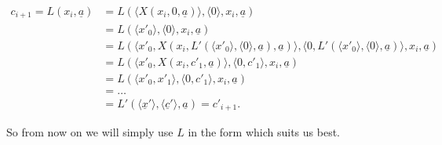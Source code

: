 \documentclass[1p]{elsarticle}
\newcommand{\tup}{\underline} %
\theoremstyle{plain}
\theoremstyle{definition}
\theoremstyle{remark}
\renewenvironment{proof}[1][]{\noindent{\bf Proof{#1}. }}{\nopagebreak[4]{\hspace*{\fill}
  $\Box$              %
 }{\vspace{2ex}}}
\renewcommand{\phi}{\varphi}
\theoremstyle{definition}
\begin{document}
\begin{proof}
\begin{align*}
c_{i+1}=L(x_i,\tup a)&=L(\langle X(x_i,0,\tup a)\rangle,\langle0\rangle,x_i,\tup a)\\
&=L(\langle x'_0\rangle,\langle0\rangle,x_i,\tup a)\\
&=L(\langle x'_0,  X(x_i,   L'(\langle x'_0\rangle,\langle0\rangle,\tup a)    ,\tup a)\rangle,\langle0, 
     L'(\langle x'_0\rangle,\langle0\rangle,\tup a)  \rangle,x_i,\tup a)\\
&=L(\langle x'_0,  X(x_i,   c'_1    ,\tup a)\rangle,\langle0, 
     c'_1  \rangle,x_i,\tup a)\\
&=L(\langle x'_0,  x'_1\rangle,\langle0, 
     c'_1  \rangle,x_i,\tup a)\\
&=\ldots\\
&=L'(\langle\tup x'\rangle,\langle\tup c'\rangle, \tup a)=c'_{i+1}.
\end{align*}


\end{proof}

So from now on we will simply use $L$ in the form which suits us best.
\end{document}
